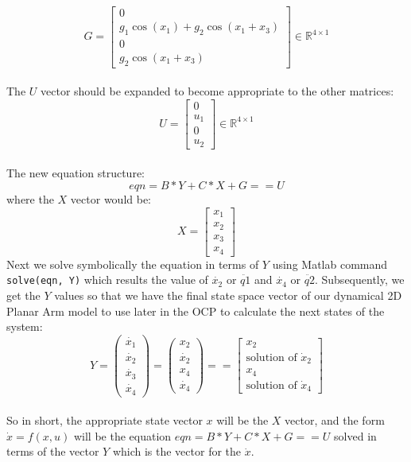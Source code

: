 \documentclass[a4paper, 12pt]{report}
\begin{document}
$$G = \begin{bmatrix}
0 \\
g_1 \cos(x_1) + g_2 \cos(x_1 + x_3) \\
0 \\
g_2 \cos(x_1 + x_3)
\end{bmatrix} \in \mathbb{R}^{4 \times 1}$$
\\The $U$ vector should be expanded to become appropriate to the other matrices:
$$U = \begin{bmatrix}0 \\u_1 \\0 \\u_2\end{bmatrix} \in \mathbb{R}^{4 \times 1}$$
\\The new equation structure:
$$eqn=B*Y+C*X+G==U$$
where the $X$ vector would be:
$$X = \left[ \begin{array}{c}
x_1 \\
x_2 \\
x_3 \\
x_4\end{array} \right]$$ 
Next we solve symbolically the equation in terms of $Y$ using Matlab command \texttt{solve(eqn, Y)} which results the value of $\dot{x_2}$ or $\ddot{q1}$ and $\dot{x_4}$ or $\ddot{q2}$. Subsequently, we get the $Y$ values so that we have the final state space vector of our dynamical 2D Planar Arm model to use later in the OCP to calculate the next states of the system:
$$Y   = \begin{pmatrix} \dot{x_1} \\ \dot{x_2} \\ \dot{x_3} \\ \dot{x_4} \end{pmatrix} = \begin{pmatrix} x_2 \\ \dot{x_2} \\ x_4 \\ \dot{x_4} \end{pmatrix} = = \left[ \begin{array}{c}
x_2 \\
\text{solution of }\dot{x}_2 \\
x_4 \\
\text{solution of } \dot{x}_4
\end{array} \right]$$
\\So in short, the appropriate state vector $x$ will be the $X$ vector, and the form $\dot{x}=f(x,u)$ will be the equation $eqn=B*Y+C*X+G==U$ solved in terms of the vector $Y$ which is the vector for the $\dot{x}$.
\end{document}
